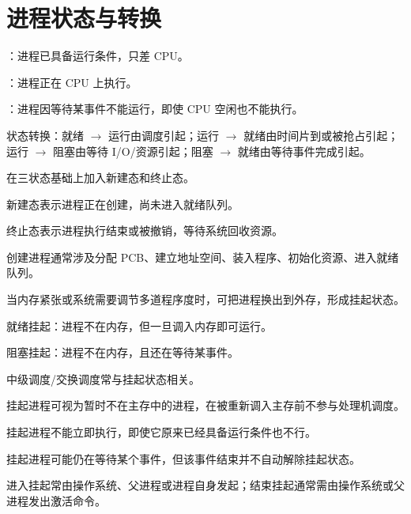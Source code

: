 \section{进程状态与转换}
\begin{points}
  \item {}：进程已具备运行条件，只差 CPU。
  \item {}：进程正在 CPU 上执行。
  \item {}：进程因等待某事件不能运行，即使 CPU 空闲也不能执行。
  \item 状态转换：就绪 $\rightarrow$ 运行由调度引起；运行 $\rightarrow$ 就绪由时间片到或被抢占引起；运行 $\rightarrow$ 阻塞由等待 I/O/资源引起；阻塞 $\rightarrow$ 就绪由等待事件完成引起。
\end{points}


\begin{points}
  \item 在三状态基础上加入新建态和终止态。
  \item 新建态表示进程正在创建，尚未进入就绪队列。
  \item 终止态表示进程执行结束或被撤销，等待系统回收资源。
  \item 创建进程通常涉及分配 PCB、建立地址空间、装入程序、初始化资源、进入就绪队列。
\end{points}


\begin{points}
  \item 当内存紧张或系统需要调节多道程序度时，可把进程换出到外存，形成挂起状态。
  \item 就绪挂起：进程不在内存，但一旦调入内存即可运行。
  \item 阻塞挂起：进程不在内存，且还在等待某事件。
  \item 中级调度/交换调度常与挂起状态相关。
\end{points}

\begin{points}
  \item 挂起进程可视为暂时不在主存中的进程，在被重新调入主存前不参与处理机调度。
  \item 挂起进程不能立即执行，即使它原来已经具备运行条件也不行。
  \item 挂起进程可能仍在等待某个事件，但该事件结束并不自动解除挂起状态。
  \item 进入挂起常由操作系统、父进程或进程自身发起；结束挂起通常需由操作系统或父进程发出激活命令。
\end{points}


